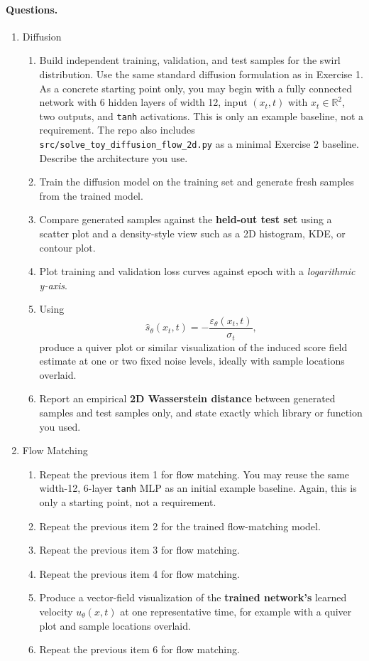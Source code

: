 \documentclass[11pt]{article}
\begin{document}
\paragraph{Questions.}
\begin{enumerate}
  \item Diffusion
  \begin{enumerate}
    \item Build independent training, validation, and test samples for the swirl distribution. Use the same standard diffusion formulation as in Exercise 1. As a concrete starting point only, you may begin with a fully connected network with 6 hidden layers of width 12, input $(x_t,t)$ with $x_t \in \mathbb{R}^2$, two outputs, and \texttt{tanh} activations. This is only an example baseline, not a requirement. The repo also includes \texttt{src/solve\_toy\_diffusion\_flow\_2d.py} as a minimal Exercise 2 baseline. Describe the architecture you use.
    \item Train the diffusion model on the training set and generate fresh samples from the trained model.
    \item Compare generated samples against the \textbf{held-out test set} using a scatter plot and a density-style view such as a 2D histogram, KDE, or contour plot.
    \item Plot training and validation loss curves against epoch with a \emph{logarithmic y-axis}.
    \item Using
    \[
      \hat{s}_\theta(x_t,t) = -\frac{\varepsilon_\theta(x_t,t)}{\sigma_t},
    \]
    produce a quiver plot or similar visualization of the induced score field estimate at one or two fixed noise levels, ideally with sample locations overlaid.
    \item Report an empirical \textbf{2D Wasserstein distance} between generated samples and test samples only, and state exactly which library or function you used.
  \end{enumerate}

  \item Flow Matching
  \begin{enumerate}
    \item Repeat the previous item 1 for flow matching. You may reuse the same width-12, 6-layer \texttt{tanh} MLP as an initial example baseline. Again, this is only a starting point, not a requirement.
    \item Repeat the previous item 2 for the trained flow-matching model.
    \item Repeat the previous item 3 for flow matching.
    \item Repeat the previous item 4 for flow matching.
    \item Produce a vector-field visualization of the \textbf{trained network's} learned velocity $u_\theta(x,t)$ at one representative time, for example with a quiver plot and sample locations overlaid.
    \item Repeat the previous item 6 for flow matching.
  \end{enumerate}
\end{enumerate}
\end{document}
